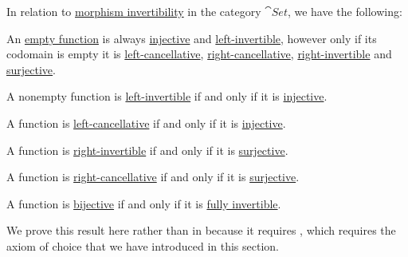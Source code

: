 \begin{proposition}\label{thm:function_invertibility_categorical}
  In relation to \hyperref[def:morphism_invertibility]{morphism invertibility} in the category \hyperref[def:category_of_small_sets]{\( \cat{Set} \)}, we have the following:
  \begin{thmenum}
     An \hyperref[def:set_valued_map/empty]{empty function} is always \hyperref[def:function_invertibility/injective]{injective} and \hyperref[def:morphism_invertibility/left_invertible]{left-invertible}, however only if its codomain is empty it is \hyperref[def:morphism_invertibility/left_cancellative]{left-cancellative}, \hyperref[def:morphism_invertibility/right_cancellative]{right-cancellative}, \hyperref[def:morphism_invertibility/right_invertible]{right-invertible} and \hyperref[def:function_invertibility/surjective]{surjective}.

     A nonempty function is \hyperref[def:morphism_invertibility/left_invertible]{left-invertible} if and only if it is \hyperref[def:function_invertibility/injective]{injective}.

     A function is \hyperref[def:morphism_invertibility/left_cancellative]{left-cancellative} if and only if it is \hyperref[def:function_invertibility/injective]{injective}.

     A function is \hyperref[def:morphism_invertibility/right_invertible]{right-invertible} if and only if it is \hyperref[def:function_invertibility/surjective]{surjective}.

     A function is \hyperref[def:morphism_invertibility/right_cancellative]{right-cancellative} if and only if it is \hyperref[def:function_invertibility/surjective]{surjective}.

     A function is \hyperref[def:function_invertibility/bijective]{bijective} if and only if it is \hyperref[def:morphism_invertibility/isomorphism]{fully invertible}.
  \end{thmenum}
\end{proposition}
\begin{comments}
  \item We prove this result here rather than in  because it requires , which requires the axiom of choice that we have introduced in this section.
\end{comments}
